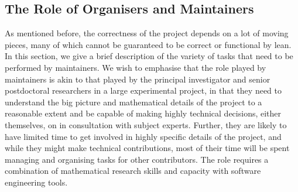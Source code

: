 \subsection{The Role of Organisers and Maintainers}
As mentioned before, the correctness of the project depends on a lot of moving pieces, many of which cannot be guaranteed to be correct or functional by lean. In this section, we give a brief description of the variety of tasks that need to be performed by maintainers. We wish to emphasise that the role played by maintainers is akin to that played by the principal investigator and senior postdoctoral researchers in a large experimental project, in that they need to understand the big picture and mathematical details of the project to a reasonable extent and be capable of making highly technical decisions, either themselves, on in consultation with subject experts. Further, they are likely to have limited time to get involved in highly specific details of the project, and while they might make technical contributions, most of their time will be spent managing and organising tasks for other contributors. The role requires a  combination of mathematical research skills and capacity with software engineering tools.

